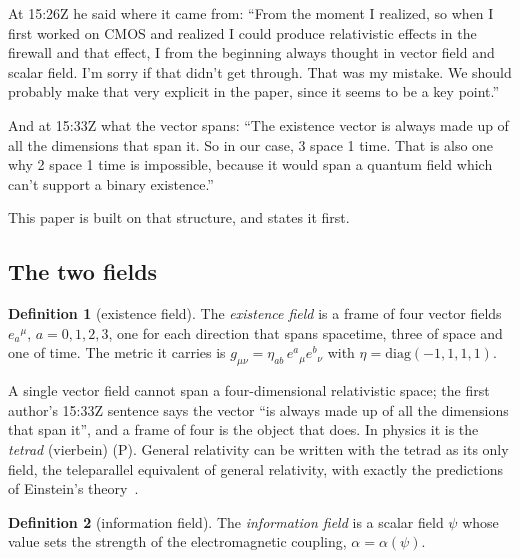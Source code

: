 \documentclass[11pt,a4paper]{article}
\theoremstyle{definition}
\newtheorem{definition}{Definition}
\theoremstyle{remark}
\newcommand{\tagP}{\textsf{(P)}}
\begin{document}
At 15:26Z he said where it came from: ``From the moment I realized, so when I first worked on CMOS and realized I could produce
relativistic effects in the firewall and that effect, I from the beginning always thought in vector field and scalar field. I'm sorry if
that didn't get through. That was my mistake. We should probably make that very explicit in the paper, since it seems to be a key point.''

And at 15:33Z what the vector spans: ``The existence vector is always made up of all the dimensions that span it. So in our case, 3 space
1 time. That is also one why 2 space 1 time is impossible, because it would span a quantum field which can't support a binary existence.''

This paper is built on that structure, and states it first.

\subsection{The two fields}

\begin{definition}[existence field]\label{def:E}
The \emph{existence field} is a frame of four vector fields $e_a{}^{\mu}$, $a=0,1,2,3$, one for each direction that spans spacetime,
three of space and one of time. The metric it carries is $g_{\mu\nu}=\eta_{ab}\,e^a{}_{\mu}e^b{}_{\nu}$ with $\eta=\mathrm{diag}(-1,1,1,1)$.
\end{definition}

\noindent A single vector field cannot span a four-dimensional relativistic space; the first author's 15:33Z sentence says the vector
``is always made up of all the dimensions that span it'', and a frame of four is the object that does. In physics it is the
\emph{tetrad} (vierbein) \tagP. General relativity can be written with the tetrad as its only field, the teleparallel equivalent of general
relativity, with exactly the predictions of Einstein's theory~\cite{aldrovandi}.

\begin{definition}[information field]\label{def:I}
The \emph{information field} is a scalar field $\psi$ whose value sets the strength of the electromagnetic coupling,
$\alpha=\alpha(\psi)$.
\end{definition}
\end{document}
